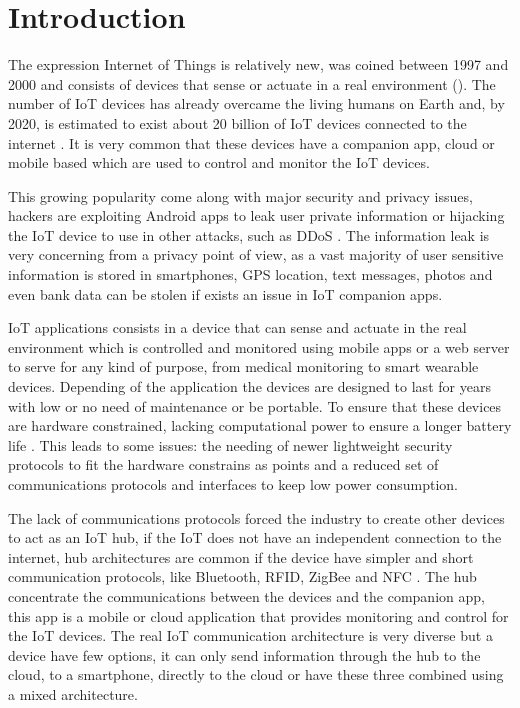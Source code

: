 \chapter{Introduction}

The expression Internet of Things is relatively new, was coined between 1997 and 2000 and consists of devices that sense or actuate in a real environment (\cite{minerva2015towards}). The number of IoT devices has already overcame the living humans on Earth and, by 2020, is estimated to exist about 20 billion of IoT devices connected to the internet \citep{iotmarket}. It is very common that these devices have a companion app, cloud or mobile based which are used to control and monitor the IoT devices.

This growing popularity come along with major security and privacy issues, hackers are exploiting Android apps to leak user private information or hijacking the IoT device to use in other attacks, such as DDoS \citep{ycraig}. The information leak is very concerning from a privacy point of view, as a vast majority of user sensitive information is stored in smartphones, GPS location, text messages, photos and even bank data can be stolen if exists an issue in IoT companion apps.

IoT applications consists in a device that can sense and actuate in the real environment which is controlled and monitored using mobile apps or a web server to serve for any kind of purpose, from medical monitoring to smart wearable devices. Depending of the application the devices are designed to last for years with low or no need of maintenance or be portable. To ensure that these devices are hardware constrained, lacking computational power to ensure a longer battery life \citep{raj2017internet}. This leads to some issues: the needing of newer lightweight security protocols to fit the hardware constrains as \cite{zhang2014iot} points and a reduced set of communications protocols and interfaces to keep low power consumption.

The lack of communications protocols forced the industry to create other devices to act as an IoT hub, if the IoT does not have an independent connection to the internet, hub architectures are common if the device have simpler and short communication protocols, like Bluetooth, RFID, ZigBee and NFC \cite{al2017internet}. The hub concentrate the communications between the devices and the companion app, this app is a mobile or cloud application that provides monitoring and control for the IoT devices. The real IoT communication architecture is very diverse but a device have few options, it can only send information through the hub to the cloud, to a smartphone, directly to the cloud or have these three combined using a mixed architecture.

